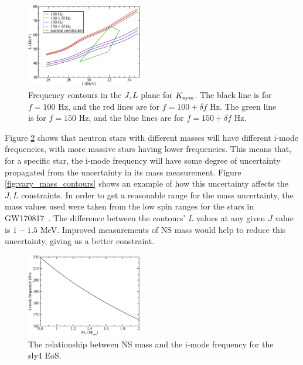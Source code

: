 \documentclass[fleqn,usenatbib]{mnras}
\begin{document}
\begin{figure}
\centering
\includegraphics[width=0.45\textwidth,angle=0]{f100_f150_tres_2.pdf}
\caption{Frequency contours in the $J,L$ plane for $K_{\rm sym}$. The black line is for $f=100$ Hz, and the red lines are for $f=100+\delta f$ Hz. The green line is for $f=150$ Hz, and the blue lines are for $f=150+\delta f$ Hz.}
\label{fig:t_res_spread}
\end{figure}

\hspace{\parindent}Figure \ref{fig:M_vs_f} shows that neutron stars with different masses will have different i-mode frequencies, with more massive stars having lower frequencies. This means that, for a specific star, the i-mode frequency will have some degree of uncertainty propagated from the uncertainty in its mass measurement. Figure \ref{fig:vary_mass_contours} shows an example of how this uncertainty affects the $J,L$ constraints. In order to get a reasonable range for the mass uncertainty, the mass values used were taken from the low spin ranges for the stars in GW170817~\cite{abbott2017merger}. The difference between the contours' $L$ values at any given $J$ value is $1-1.5$ MeV. Improved measurements of NS mass would help to reduce this uncertainty, giving us a better constraint.

\begin{figure}
\centering
\includegraphics[width=0.45\textwidth,angle=0]{M_vs_f}
\caption{The relationship between NS mass and the i-mode frequency for the sly4 EoS.}
\label{fig:M_vs_f}
\end{figure}
\end{document}
